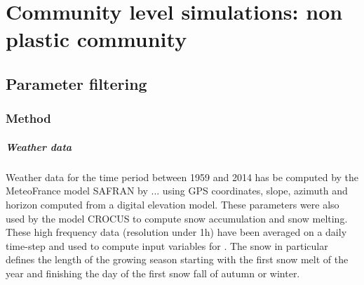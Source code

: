 
%
%

\chapter{Community level simulations: non plastic community}


\section{Parameter filtering}
\subsection{Method}


\paragraph{Weather data}
Weather data for the time period between 1959 and 2014 has be computed by the MeteoFrance model SAFRAN by ... using GPS coordinates, slope, azimuth and horizon computed from a digital elevation model. These parameters were also used by the model CROCUS to compute snow accumulation and snow melting. These high frequency data (resolution under 1h) have been averaged on a daily time-step and used to compute input variables for \model. The snow in particular defines the length of the growing season starting with the first snow melt of the year and finishing the day of the first snow fall of autumn or winter.

